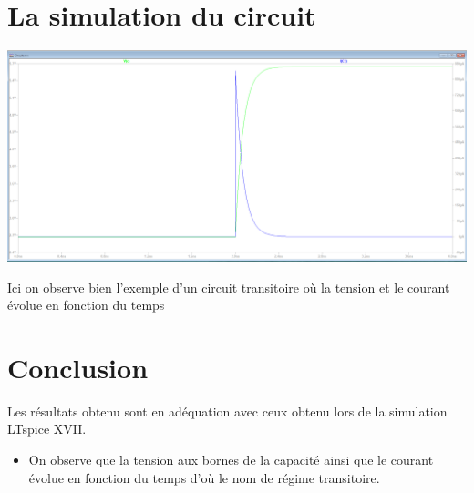 \documentclass{homeworg}
\begin{document}
\newpage
\section{La simulation du circuit}
    \begin{center}
        \includegraphics[scale=0.35]{Graph.PNG}
    \end{center}
    Ici on observe bien l'exemple d'un circuit transitoire où la tension et le courant évolue en fonction du temps
\section{Conclusion}
    Les résultats obtenu sont en adéquation avec ceux obtenu lors de la simulation LTspice XVII.
    \begin{itemize}
        \item On observe que la tension aux bornes de la capacité ainsi que le courant évolue en fonction du temps d'où le nom de régime transitoire.
    \end{itemize}
\end{document}
